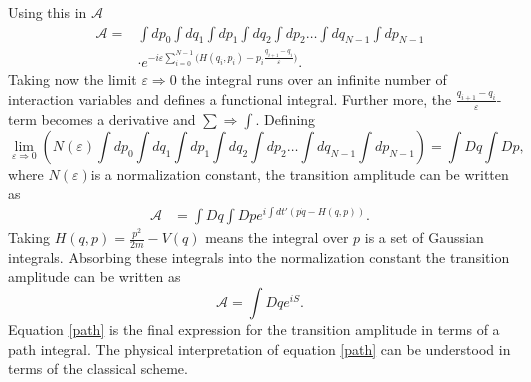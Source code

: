 Using this in $\mathcal{A}$
\begin{equation}
	\begin{split}
		\mathcal{A}=&\int dp_0\int dq_1 \int dp_1 \int dq_2  \int dp_2\dots \int dq_{N-1} \int dp_{N-1}\\
		&\cdot e^{-i\varepsilon\sum_{i=0}^{N-1}\big(H(q_i,p_i)-p_i\frac{q_{i+1}-q_i}{\varepsilon}\big)}.
	\end{split}
\end{equation} 
Taking now the limit $\varepsilon\Rightarrow 0$ the integral runs over an infinite number of interaction variables and defines a functional integral. Further more, the $\frac{q_{i+1}-q_i}{\varepsilon}$-term becomes a derivative and $\sum\Rightarrow \int$. Defining 
\begin{equation}
	\lim\limits_{\varepsilon\Rightarrow 0}(N(\varepsilon)\int dp_0\int dq_1 \int dp_1 \int dq_2  \int dp_2\dots \int dq_{N-1} \int dp_{N-1})= \int Dq\int Dp,
\end{equation}
where $N(\varepsilon)$\normalsize is a normalization constant, the transition amplitude can be written as
\begin{equation}
	\begin{split}
		\mathcal{A}&=\int Dq \int Dp e^{i\int dt'(p\dot{q}-H(q,p))}.
	\end{split}
\end{equation} 
Taking $H(q,p)=\frac{p^2}{2m}-V(q)$ means the integral over $p$ is a set of Gaussian integrals. Absorbing these integrals into the normalization constant the transition amplitude can be written as
\begin{equation}
	\mathcal{A}=\int Dq e^{iS}.
	\label{path}
\end{equation} 
Equation \eqref{path} is the final expression for the transition amplitude in terms of a path integral. The physical interpretation of equation \eqref{path} can be understood in terms of the classical scheme.

